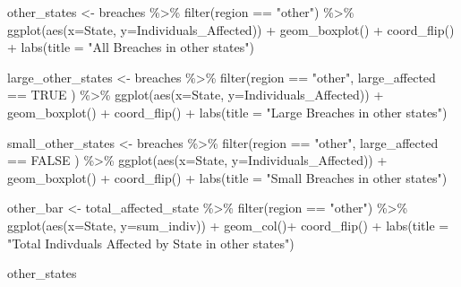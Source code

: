\documentclass[
]{article}
\newenvironment{Shaded}{\begin{snugshade}}{\end{snugshade}}
\newcommand{\AttributeTok}[1]{\textcolor[rgb]{0.77,0.63,0.00}{#1}}
\newcommand{\ConstantTok}[1]{\textcolor[rgb]{0.00,0.00,0.00}{#1}}
\newcommand{\FunctionTok}[1]{\textcolor[rgb]{0.00,0.00,0.00}{#1}}
\newcommand{\NormalTok}[1]{#1}
\newcommand{\OtherTok}[1]{\textcolor[rgb]{0.56,0.35,0.01}{#1}}
\newcommand{\SpecialCharTok}[1]{\textcolor[rgb]{0.00,0.00,0.00}{#1}}
\newcommand{\StringTok}[1]{\textcolor[rgb]{0.31,0.60,0.02}{#1}}
\begin{document}
\begin{Shaded}
\begin{Highlighting}[]
\NormalTok{other\_states }\OtherTok{\textless{}{-}}\NormalTok{ breaches }\SpecialCharTok{\%\textgreater{}\%}
  \FunctionTok{filter}\NormalTok{(region }\SpecialCharTok{==} \StringTok{"other"}\NormalTok{) }\SpecialCharTok{\%\textgreater{}\%}
  \FunctionTok{ggplot}\NormalTok{(}\FunctionTok{aes}\NormalTok{(}\AttributeTok{x=}\NormalTok{State, }\AttributeTok{y=}\NormalTok{Individuals\_Affected)) }\SpecialCharTok{+}
  \FunctionTok{geom\_boxplot}\NormalTok{() }\SpecialCharTok{+} 
  \FunctionTok{coord\_flip}\NormalTok{() }\SpecialCharTok{+}
  \FunctionTok{labs}\NormalTok{(}\AttributeTok{title =} \StringTok{"All Breaches in other states"}\NormalTok{)}

\NormalTok{large\_other\_states }\OtherTok{\textless{}{-}}\NormalTok{ breaches }\SpecialCharTok{\%\textgreater{}\%}
  \FunctionTok{filter}\NormalTok{(region }\SpecialCharTok{==} \StringTok{"other"}\NormalTok{, large\_affected }\SpecialCharTok{==} \ConstantTok{TRUE}\NormalTok{ ) }\SpecialCharTok{\%\textgreater{}\%}
  \FunctionTok{ggplot}\NormalTok{(}\FunctionTok{aes}\NormalTok{(}\AttributeTok{x=}\NormalTok{State, }\AttributeTok{y=}\NormalTok{Individuals\_Affected)) }\SpecialCharTok{+}
  \FunctionTok{geom\_boxplot}\NormalTok{() }\SpecialCharTok{+} 
  \FunctionTok{coord\_flip}\NormalTok{() }\SpecialCharTok{+}
  \FunctionTok{labs}\NormalTok{(}\AttributeTok{title =} \StringTok{"Large Breaches in other states"}\NormalTok{)}

\NormalTok{small\_other\_states }\OtherTok{\textless{}{-}}\NormalTok{ breaches }\SpecialCharTok{\%\textgreater{}\%}
  \FunctionTok{filter}\NormalTok{(region }\SpecialCharTok{==} \StringTok{"other"}\NormalTok{, large\_affected }\SpecialCharTok{==} \ConstantTok{FALSE}\NormalTok{ ) }\SpecialCharTok{\%\textgreater{}\%}
  \FunctionTok{ggplot}\NormalTok{(}\FunctionTok{aes}\NormalTok{(}\AttributeTok{x=}\NormalTok{State, }\AttributeTok{y=}\NormalTok{Individuals\_Affected)) }\SpecialCharTok{+}
  \FunctionTok{geom\_boxplot}\NormalTok{() }\SpecialCharTok{+} 
  \FunctionTok{coord\_flip}\NormalTok{() }\SpecialCharTok{+}
  \FunctionTok{labs}\NormalTok{(}\AttributeTok{title =} \StringTok{"Small Breaches in other states"}\NormalTok{)}

\NormalTok{other\_bar }\OtherTok{\textless{}{-}}\NormalTok{ total\_affected\_state }\SpecialCharTok{\%\textgreater{}\%}
  \FunctionTok{filter}\NormalTok{(region }\SpecialCharTok{==} \StringTok{"other"}\NormalTok{) }\SpecialCharTok{\%\textgreater{}\%}
  \FunctionTok{ggplot}\NormalTok{(}\FunctionTok{aes}\NormalTok{(}\AttributeTok{x=}\NormalTok{State, }\AttributeTok{y=}\NormalTok{sum\_indiv)) }\SpecialCharTok{+}
  \FunctionTok{geom\_col}\NormalTok{()}\SpecialCharTok{+}
  \FunctionTok{coord\_flip}\NormalTok{() }\SpecialCharTok{+}
  \FunctionTok{labs}\NormalTok{(}\AttributeTok{title =} \StringTok{"Total Indivduals Affected by State in other states"}\NormalTok{)}

\NormalTok{other\_states}
\end{Highlighting}
\end{Shaded}
\end{document}
